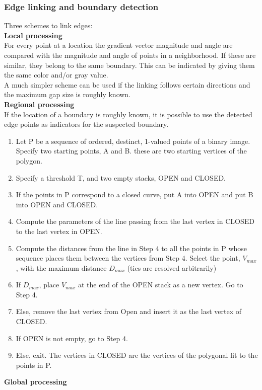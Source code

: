 \subsubsection{Edge linking and boundary detection}
Three schemes to link edges:\\
\textbf{Local processing}\\
For every point at a location the gradient vector magnitude and angle are compared with the magnitude and angle of points in a neighborhood. If these are similar, they belong to the same boundary. This can be indicated by giving them the same color and/or gray value.\\
A much simpler scheme can be used if the linking follows certain directions and the maximum gap size is roughly known.\\
\textbf{Regional processing}\\
If the location of a boundary is roughly known, it is possible to use the detected edge points as indicators for the suspected boundary.
\begin{enumerate}
\item Let P be a sequence of ordered, destinct, 1-valued points of a binary image. Specify two starting points, A and B. these are two starting vertices of the polygon.
\item Specify a threshold T, and two empty stacks, OPEN and CLOSED.
\item If the points in P correspond to a closed curve, put A into OPEN and put B into OPEN and CLOSED.
\item Compute the parameters of the line passing from the last vertex in CLOSED to the last vertex in OPEN.
\item Compute the distances from the line in Step 4 to all the points in P whose sequence places them between the vertices from Step 4. Select the point, $V_{max}$, with the maximum distance $D_{max}$ (ties are resolved arbitrarily)
\item If $D_{max}$, place $V_{max}$ at the end of the OPEN stack as a new vertex. Go to Step 4.
\item Else, remove the last vertex from Open and insert it as the last vertex of CLOSED.
\item If OPEN is not empty, go to Step 4.
\item Else, exit. The vertices in CLOSED are the vertices of the polygonal fit to the points in P.
\end{enumerate}
\textbf{Global processing}\\